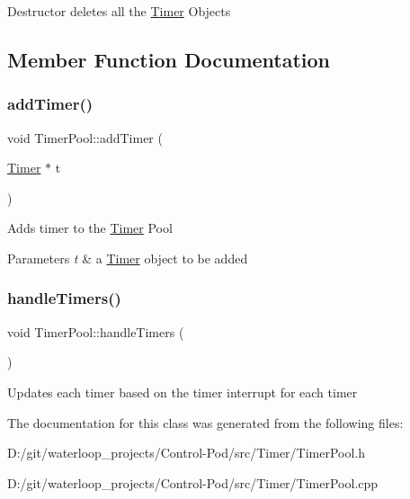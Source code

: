 Destructor deletes all the \hyperlink{struct_timer_pool_1_1_timer}{Timer} Objects 

\subsection{Member Function Documentation}
\mbox{\label{class_timer_pool_a06d25c2cdf9bca4418c23cc3d914846f}} 
\subsubsection{\texorpdfstring{add\+Timer()}{addTimer()}}
{\footnotesize\ttfamily void Timer\+Pool\+::add\+Timer (\begin{DoxyParamCaption}\item[{\hyperlink{struct_timer_pool_1_1_timer}{Timer} $\ast$}]{t }\end{DoxyParamCaption})}

Adds timer to the \hyperlink{struct_timer_pool_1_1_timer}{Timer} Pool 
\begin{DoxyParams}{Parameters}
{\em t} & a \hyperlink{struct_timer_pool_1_1_timer}{Timer} object to be added \\
\hline
\end{DoxyParams}
\mbox{\label{class_timer_pool_a4476fbaa8e585ec0877e741a5df44fa1}} 
\subsubsection{\texorpdfstring{handle\+Timers()}{handleTimers()}}
{\footnotesize\ttfamily void Timer\+Pool\+::handle\+Timers (\begin{DoxyParamCaption}{ }\end{DoxyParamCaption})}

Updates each timer based on the timer interrupt for each timer 

The documentation for this class was generated from the following files\+:\begin{DoxyCompactItemize}
\item 
D\+:/git/waterloop\+\_\+projects/\+Control-\/\+Pod/src/\+Timer/Timer\+Pool.\+h\item 
D\+:/git/waterloop\+\_\+projects/\+Control-\/\+Pod/src/\+Timer/Timer\+Pool.\+cpp\end{DoxyCompactItemize}
